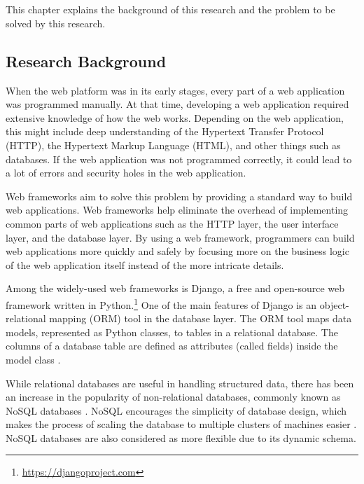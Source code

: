 \chapter{\babSatu}

This chapter explains the background of this research and the problem to be
solved by this research.

\section{Research Background}

When the web platform was in its early stages, every part of a web application
was programmed manually. At that time, developing a web application required
extensive knowledge of how the web works. Depending on the web application,
this might include deep understanding of the Hypertext Transfer Protocol
(HTTP), the Hypertext Markup Language (HTML), and other things such as
databases. If the web application was not programmed correctly, it could lead
to a lot of errors and security holes in the web application.

Web frameworks aim to solve this problem by providing a standard way to build
web applications. Web frameworks help eliminate the overhead of implementing
common parts of web applications such as the HTTP layer, the user interface
layer, and the database layer. By using a web framework, programmers can build
web applications more quickly and safely by focusing more on the business logic
of the web application itself instead of the more intricate details.

Among the widely-used web frameworks is Django, a free and open-source web
framework written in Python.\footnote{\url{https://djangoproject.com}} One of
the main features of Django is an object-relational mapping (ORM) tool in the
database layer. The ORM tool maps data models, represented as Python classes,
to tables in a relational database. The columns of a database table are defined
as attributes (called fields) inside the model class \cite{django}.

While relational databases are useful in handling structured data, there has
been an increase in the popularity of non-relational databases, commonly known
as NoSQL databases \cite{paul_nosql}. NoSQL encourages the simplicity of
database design, which makes the process of scaling the database to multiple
clusters of machines easier \cite{leavitt_nosql}. NoSQL databases are also
considered as more flexible due to its dynamic schema.

